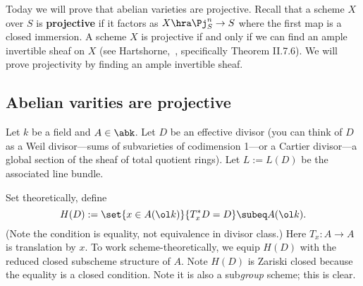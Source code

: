 
Today we will prove that abelian varieties are projective. Recall that a scheme $X$ over $S$ is \textbf{projective} if it factors as $X\hra \Pj_S^n \to S$ where the first map is a closed immersion. A scheme $X$ is projective if and only if we can find an ample invertible sheaf on $X$ (see Hartshorne,~\cite[\S II.7]{Ha77}, specifically Theorem II.7.6). We will prove projectivity by finding an ample invertible sheaf.

\subsection{Abelian varities are projective}

Let $k$ be a field and $A\in \abk$. Let $D$ be an effective divisor (you can think of $D$ as a Weil divisor---sums of subvarieties of codimension 1---or a Cartier divisor---a global section of the sheaf of total quotient rings). Let $L:=L(D)$ be the associated line bundle.

Set theoretically, define
\[
H(D):=\set{x\in A(\ol k)}{T_x^*D=D}\subeq A(\ol k).
\]
(Note the condition is equality, not equivalence in divisor class.)
Here $T_x:A\to A$ is translation by $x$. To work scheme-theoretically, we equip $H(D)$ with the reduced closed subscheme structure of $A$. Note $H(D)$ is Zariski closed because the equality is a closed condition. %
Note it is also a sub{\it group }scheme; this is clear.


